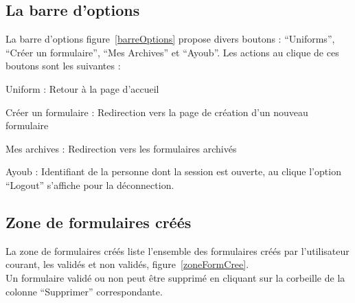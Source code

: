 \documentclass[a4paper,11pt,final]{report}
\begin{document}
\subsection{La barre d'options}
La barre d'options figure~\ref{barreOptions} propose divers boutons : ``Uniforms'', ``Créer un formulaire'', ``Mes Archives'' et ``Ayoub''. Les actions au clique de ces boutons sont les suivantes :
\begin{description}
	\item Uniform : Retour à la page d'accueil
	\item Créer un formulaire : Redirection vers la page de création d'un nouveau formulaire
	\item Mes archives : Redirection vers les formulaires archivés
	\item Ayoub : Identifiant de la personne dont la session est ouverte, au clique l'option ``Logout'' s'affiche pour la déconnection.
\end{description}

\noindent\begin{minipage}{\linewidth}%
\label{barreOptions}
\end{minipage}

\subsection{Zone de formulaires créés}
La zone de formulaires créés liste l'ensemble des formulaires créés par l'utilisateur courant, les validés et non validés, figure~\ref{zoneFormCree}.\\
Un formulaire validé ou non peut être supprimé en cliquant sur la corbeille de la colonne ``Supprimer'' correspondante.

\noindent\begin{minipage}{\linewidth}%
\label{zoneFormCree}
\end{minipage}
\end{document}
